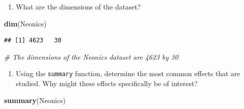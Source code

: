 \documentclass[]{article}
\newenvironment{Shaded}{\begin{snugshade}}{\end{snugshade}}
\newcommand{\KeywordTok}[1]{\textcolor[rgb]{0.13,0.29,0.53}{\textbf{#1}}}
\newcommand{\CommentTok}[1]{\textcolor[rgb]{0.56,0.35,0.01}{\textit{#1}}}
\newcommand{\NormalTok}[1]{#1}
\providecommand{\tightlist}{%
  \setlength{\itemsep}{0pt}\setlength{\parskip}{0pt}}
\begin{document}
\begin{enumerate}
\def\labelenumi{\arabic{enumi}.}
\setcounter{enumi}{4}
\tightlist
\item
  What are the dimensions of the dataset?
\end{enumerate}

\begin{Shaded}
\begin{Highlighting}[]
\KeywordTok{dim}\NormalTok{(Neonics)}
\end{Highlighting}
\end{Shaded}

\begin{verbatim}
## [1] 4623   30
\end{verbatim}

\begin{Shaded}
\begin{Highlighting}[]
\CommentTok{# The dimensions of the Neonics dataset are 4623 by 30}
\end{Highlighting}
\end{Shaded}

\begin{enumerate}
\def\labelenumi{\arabic{enumi}.}
\setcounter{enumi}{5}
\tightlist
\item
  Using the \texttt{summary} function, determine the most common effects
  that are studied. Why might these effects specifically be of interest?
\end{enumerate}

\begin{Shaded}
\begin{Highlighting}[]
\KeywordTok{summary}\NormalTok{(Neonics)}
\end{Highlighting}
\end{Shaded}
\end{document}
